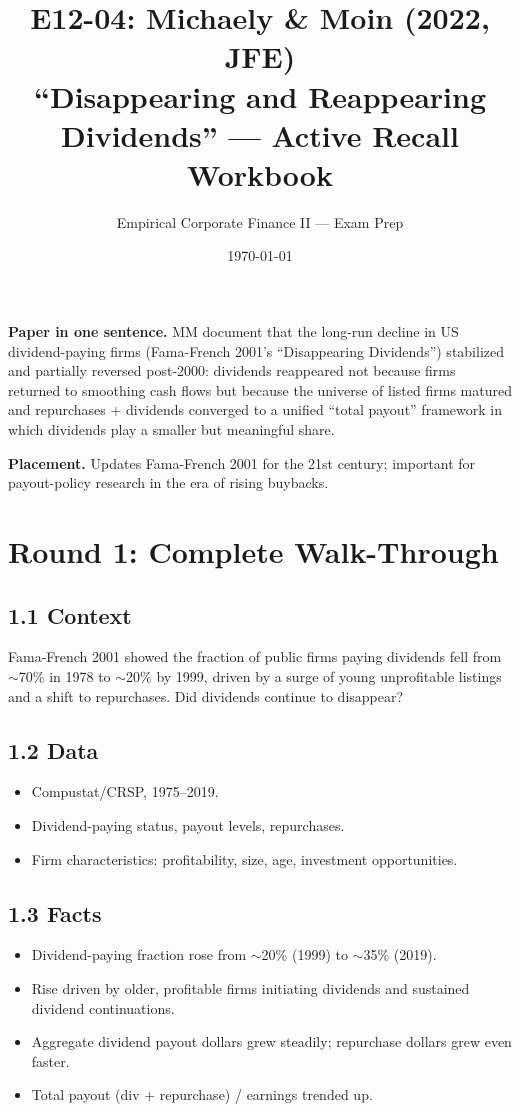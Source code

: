 \documentclass[11pt]{article}
\title{E12-04: Michaely \& Moin (2022, JFE) \\
\large ``Disappearing and Reappearing Dividends'' --- Active Recall Workbook}
\author{Empirical Corporate Finance II --- Exam Prep}
\date{\today}
\begin{document}
\maketitle

\begin{keybox}
\textbf{Paper in one sentence.} MM document that the long-run decline in US dividend-paying firms (Fama-French 2001's ``Disappearing Dividends'') stabilized and partially reversed post-2000: dividends reappeared not because firms returned to smoothing cash flows but because the universe of listed firms matured and repurchases + dividends converged to a unified ``total payout'' framework in which dividends play a smaller but meaningful share.

\textbf{Placement.} Updates Fama-French 2001 for the 21st century; important for payout-policy research in the era of rising buybacks.
\end{keybox}

\section*{Round 1: Complete Walk-Through}

\subsection*{1.1 Context}
Fama-French 2001 showed the fraction of public firms paying dividends fell from $\sim$70\% in 1978 to $\sim$20\% by 1999, driven by a surge of young unprofitable listings and a shift to repurchases. Did dividends continue to disappear?

\subsection*{1.2 Data}
\begin{itemize}
\item Compustat/CRSP, 1975--2019.
\item Dividend-paying status, payout levels, repurchases.
\item Firm characteristics: profitability, size, age, investment opportunities.
\end{itemize}

\subsection*{1.3 Facts}
\begin{itemize}
\item Dividend-paying fraction rose from $\sim$20\% (1999) to $\sim$35\% (2019).
\item Rise driven by older, profitable firms initiating dividends and sustained dividend continuations.
\item Aggregate dividend payout dollars grew steadily; repurchase dollars grew even faster.
\item Total payout (div + repurchase) / earnings trended up.
\end{itemize}
\end{document}
